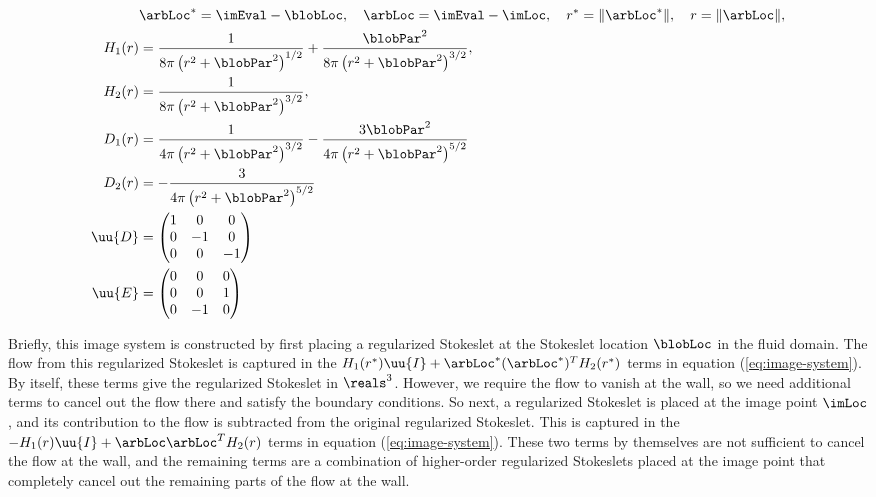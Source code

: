 \begin{align*}
  & \arbLoc^* = \imEval - \blobLoc, \quad \arbLoc = \imEval - \imLoc, 
  \quad r^* = \|\arbLoc^*\|, \quad r = \|\arbLoc\|, \\
  H_1(r) &= \frac{1}{8\pi \left(r^2 + \blobPar^2 \right)^{1/2}} +
           \frac{\blobPar^2}{8\pi \left(r^2 + \blobPar^2
           \right)^{3/2}}, \\
  H_2(r) &= \frac{1}{8\pi \left(r^2 + \blobPar^2 \right)^{3/2}}, \\
  D_1(r) &= \frac{1}{4\pi \left(r^2 + \blobPar^2 \right)^{3/2}} -
           \frac{3\blobPar^2}{4\pi \left(r^2 + \blobPar^2
           \right)^{5/2}} \\
  D_2(r) &= -\frac{3}{4\pi \left(r^2 + \blobPar^2 \right)^{5/2}} \\
  \uu{D} &=
           \begin{pmatrix}
             1 & 0 & 0 \\
             0 & -1 & 0 \\
             0 & 0 & -1
           \end{pmatrix} \\
  \uu{E} &=
           \begin{pmatrix}
             0 & 0 & 0 \\
             0 & 0 & 1 \\
             0 & -1 & 0
           \end{pmatrix}
\end{align*}

Briefly, this image system is constructed by first placing a
regularized Stokeslet at the Stokeslet location $\blobLoc$ in the
fluid domain. The flow from this regularized Stokeslet is captured in
the $H_1(r^*) \uu{I} + \arbLoc^* (\arbLoc^*)^T H_2(r^*)$ terms in
equation (\ref{eq:image-system}). By itself, these terms give the
regularized Stokeslet in $\reals^3$. However, we require the flow to
vanish at the wall, so we need additional terms to cancel out the flow
there and satisfy the boundary conditions. So next, a regularized
Stokeslet is placed at the image point $\imLoc$, and its contribution
to the flow is subtracted from the original regularized
Stokeslet. This is captured in the $-H_1(r) \uu{I} + \arbLoc \arbLoc^T
H_2(r)$ terms in equation (\ref{eq:image-system}). These two terms by
themselves are not sufficient to cancel the flow at the wall, and the
remaining terms are a combination of higher-order regularized
Stokeslets placed at the image point that completely cancel out the
remaining parts of the flow at the wall.

